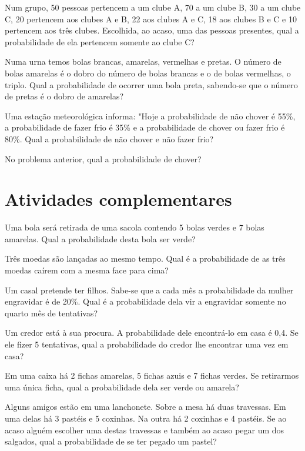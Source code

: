 		\item Num grupo, 50 pessoas pertencem a um clube A, 70 a um clube B, 30 a um clube C, 20 pertencem aos clubes A e B, 22 aos clubes A e C, 18 aos clubes B e C e 10 pertencem aos três clubes. Escolhida, ao acaso, uma das pessoas presentes, qual a probabilidade de ela pertencem somente ao clube C? 
		\item Numa urna temos bolas brancas, amarelas, vermelhas e pretas. O número de bolas amarelas é o dobro do número de bolas brancas e  o  de  bolas  vermelhas,  o  triplo.  Qual  a  probabilidade  de  ocorrer uma bola preta, sabendo-se que o número de pretas é o dobro de amarelas? 
		\item Uma estação meteorológica informa: "Hoje a probabilidade de não chover   é   55\%,   a   probabilidade   de   fazer   frio   é   35\% e a probabilidade de chover ou fazer frio é 80\%. Qual a probabilidade de não chover e não fazer frio? 
		\item No problema anterior, qual a probabilidade de chover? 
				
	\section{Atividades complementares}
		
			\item  Uma bola será retirada de uma sacola contendo 5 bolas verdes e 7 bolas amarelas. Qual a probabilidade desta bola ser verde?

 
			\item Três moedas são lançadas ao mesmo tempo. Qual é a probabilidade de as três moedas caírem com a mesma face para cima?

 
			\item Um casal pretende ter filhos. Sabe-se que a cada mês a probabilidade da mulher engravidar é de 20\%. Qual é a probabilidade dela vir a engravidar somente no quarto mês de tentativas?

 
			\item Um credor está à sua procura. A probabilidade dele encontrá-lo em casa é 0,4. Se ele fizer 5 tentativas, qual a probabilidade do credor lhe encontrar uma vez em casa?

 
			\item Em uma caixa há 2 fichas amarelas, 5 fichas azuis e 7 fichas verdes. Se retirarmos uma única ficha, qual a probabilidade dela ser verde ou amarela?

 
			\item Alguns amigos estão em uma lanchonete. Sobre a mesa há duas travessas. Em uma delas há 3 pastéis e 5 coxinhas. Na outra há 2 coxinhas e 4 pastéis. Se ao acaso alguém escolher uma destas travessas e também ao acaso pegar um dos salgados, qual a probabilidade de se ter pegado um pastel?


